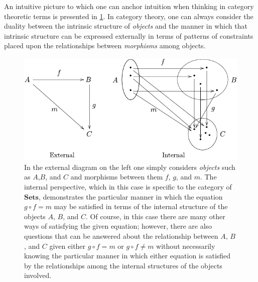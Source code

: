 An intuitive picture to which one can anchor intuition when thinking in category theoretic terms is presented in \ref{fig:intextdiag}. In category theory, one can always consider the duality between the intrinsic structure of \emph{objects} and the manner in which that intrinsic structure can be expressed externally in terms of patterns of constraints placed upon the relationships between \emph{morphisms} among objects.

\begin{figure}
\begin{center}
\noindent\includegraphics[width=0.8\columnwidth]{fig/intextdiag.pdf}
\end{center}
\caption{In the external diagram on the left one simply considers \emph{objects} such as $A$,$B$, and $C$ and morphisms between them $f$, $g$, and $m$. The internal perspective, which in this case is specific to the category of $\mathbf{Sets}$, demonstrates the particular manner in which the equation $g \circ f = m$ may be satisfied in terms of the internal structure of the objects $A$, $B$, and $C$. Of course, in this case there are many other ways of satisfying the given equation; however, there are also questions that can be answered about the relationship between $A$, $B$, and $C$ given either $g \circ f = m$ or $g \circ f \neq m$ without necessarily knowing the particular manner in which either equation is satisfied by the relationships among the internal structures of the objects involved.}
\label{fig:intextdiag}
\end{figure}
